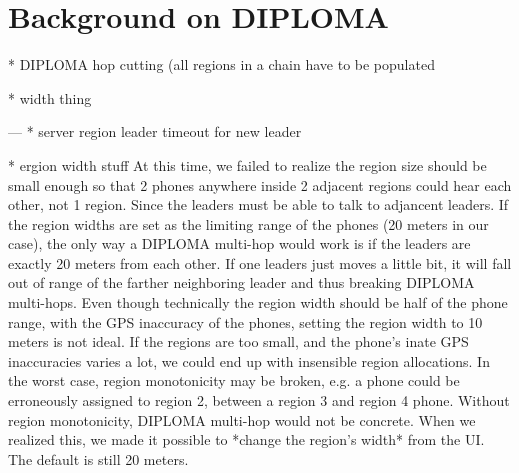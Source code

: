 \chapter{Background on DIPLOMA}

* DIPLOMA hop cutting (all regions in a chain have to be populated

* width thing

---
* server region leader timeout for new leader

* ergion width stuff
At this time, we failed to realize the region size should be small enough so that 2 phones anywhere inside 2 adjacent regions could hear each other, not 1 region. Since the leaders must be able to talk to adjancent leaders. If the region widths are set as the limiting range of the phones (20 meters in our case), the only way a DIPLOMA multi-hop would work is if the leaders are exactly 20 meters from each other. If one leaders just moves a little bit, it will fall out of range of the farther neighboring leader and thus breaking DIPLOMA multi-hops.
    Even though technically the region width should be half of the phone range, with the GPS inaccuracy of the phones, setting the region width to 10 meters is not ideal. If the regions are too small, and the phone's inate GPS inaccuracies varies a lot, we could end up with insensible region allocations. In the worst case, region monotonicity may be broken, e.g. a phone could be erroneously assigned to region 2, between a region 3 and region 4 phone. Without region monotonicity, DIPLOMA multi-hop would not be concrete.
    When we realized this, we made it possible to *change the region's width* from the UI. The default is still 20 meters.
